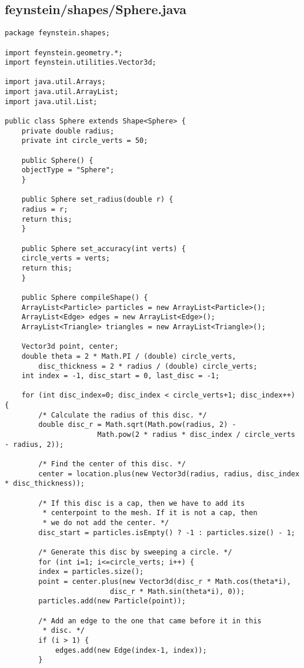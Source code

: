 \subsection*{feynstein/shapes/Sphere.java}
\begin{lstlisting}
package feynstein.shapes;

import feynstein.geometry.*;
import feynstein.utilities.Vector3d;

import java.util.Arrays;
import java.util.ArrayList;
import java.util.List;

public class Sphere extends Shape<Sphere> {
    private double radius;
    private int circle_verts = 50;

    public Sphere() {
	objectType = "Sphere";
    }

    public Sphere set_radius(double r) {
	radius = r;
	return this;
    }

    public Sphere set_accuracy(int verts) {
	circle_verts = verts;
	return this;
    }

    public Sphere compileShape() {
	ArrayList<Particle> particles = new ArrayList<Particle>();
	ArrayList<Edge> edges = new ArrayList<Edge>();
	ArrayList<Triangle> triangles = new ArrayList<Triangle>();

	Vector3d point, center;
	double theta = 2 * Math.PI / (double) circle_verts, 
	    disc_thickness = 2 * radius / (double) circle_verts;
	int index = -1, disc_start = 0, last_disc = -1;

	for (int disc_index=0; disc_index < circle_verts+1; disc_index++) {
	    /* Calculate the radius of this disc. */
	    double disc_r = Math.sqrt(Math.pow(radius, 2) - 
				      Math.pow(2 * radius * disc_index / circle_verts - radius, 2));

	    /* Find the center of this disc. */
	    center = location.plus(new Vector3d(radius, radius, disc_index * disc_thickness));

	    /* If this disc is a cap, then we have to add its
	     * centerpoint to the mesh. If it is not a cap, then
	     * we do not add the center. */
	    disc_start = particles.isEmpty() ? -1 : particles.size() - 1;
		
	    /* Generate this disc by sweeping a circle. */
	    for (int i=1; i<=circle_verts; i++) {
		index = particles.size();
		point = center.plus(new Vector3d(disc_r * Math.cos(theta*i),
						 disc_r * Math.sin(theta*i), 0));
		particles.add(new Particle(point));

		/* Add an edge to the one that came before it in this
		 * disc. */
		if (i > 1) {
		    edges.add(new Edge(index-1, index));
		}


\end{lstlisting}
